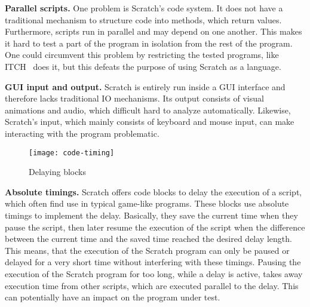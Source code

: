 \textbf{Parallel scripts.}
One problem is Scratch's code system.
It does not have a traditional mechanism to structure code into methods, which return values.
Furthermore, scripts run in parallel and may depend on one another.
This makes it hard to test a part of the program in isolation from the rest of the program.
One could circumvent this problem by restricting the tested programs, like ITCH~\cite{itch} does it,
but this defeats the purpose of using Scratch as a language.
\parspace

\textbf{GUI input and output.}
Scratch is entirely run inside a GUI interface and therefore lacks traditional IO mechanisms.
Its output consists of visual animations and audio, which difficult hard to analyze automatically.
Likewise, Scratch's input, which mainly consists of keyboard and mouse input, can make interacting with the program problematic.
\parspace

\begin{wrapfigure}{r}{0.25\textwidth + 5mm}
    \centering
    \vspace{-6mm}
    \texttt{[image: code-timing]}
    \vspace{-3mm}
    \caption{Delaying blocks}
    \label{fig:delaying_blocks}
    \vspace{-3mm}
\end{wrapfigure}

\textbf{Absolute timings.}
Scratch offers code blocks to delay the execution of a script, which often find use in typical game-like programs.
These blocks use absolute timings to implement the delay.
Basically, they save the current time when they pause the script,
then later resume the execution of the script when the difference between the current time and the saved time reached the desired delay length.
This means, that the execution of the Scratch program can only be paused or delayed for a very short time without interfering with these timings.
Pausing the execution of the Scratch program for too long, while a delay is active,
takes away execution time from other scripts, which are executed parallel to the delay.
This can potentially have an impact on the program under test.


